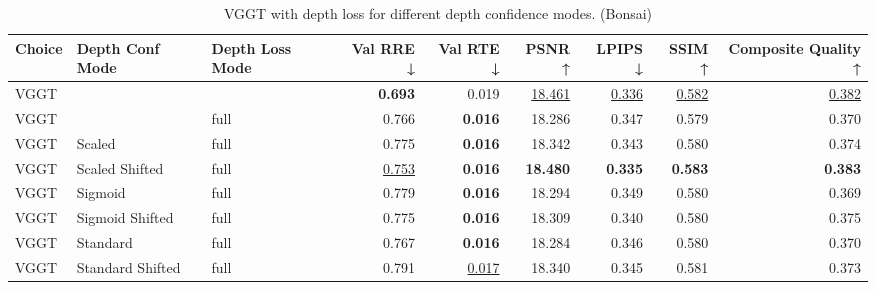 \begin{table}[H]
\caption{\ifdefined\customcaption \customcaption \else VGGT with depth loss for different depth confidence modes. (Bonsai) \fi}
\label{tab:05_depth_conf_mode_bonsai}
\centering
\scriptsize
\begin{tabular}{lllrrrrrr}
\toprule
Choice & Depth Conf Mode & Depth Loss Mode & Val RRE ↓ & Val RTE ↓ & PSNR ↑ & LPIPS ↓ & SSIM ↑ & Composite Quality ↑ \\
\midrule
VGGT &  &  & \textbf{0.693} & 0.019 & \underline{18.461} & \underline{0.336} & \underline{0.582} & \underline{0.382} \\
VGGT &  & full & 0.766 & \textbf{0.016} & 18.286 & 0.347 & 0.579 & 0.370 \\
VGGT & Scaled & full & 0.775 & \textbf{0.016} & 18.342 & 0.343 & 0.580 & 0.374 \\
VGGT & Scaled Shifted & full & \underline{0.753} & \textbf{0.016} & \textbf{18.480} & \textbf{0.335} & \textbf{0.583} & \textbf{0.383} \\
VGGT & Sigmoid & full & 0.779 & \textbf{0.016} & 18.294 & 0.349 & 0.580 & 0.369 \\
VGGT & Sigmoid Shifted & full & 0.775 & \textbf{0.016} & 18.309 & 0.340 & 0.580 & 0.375 \\
VGGT & Standard & full & 0.767 & \textbf{0.016} & 18.284 & 0.346 & 0.580 & 0.370 \\
VGGT & Standard Shifted & full & 0.791 & \underline{0.017} & 18.340 & 0.345 & 0.581 & 0.373 \\
\bottomrule
\end{tabular}
\end{table}